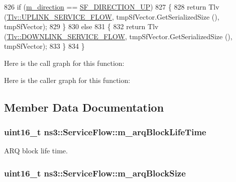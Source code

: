 \begin{DoxyCode}
826   \textcolor{keywordflow}{if} (\hyperlink{classns3_1_1ServiceFlow_aeadd654a7d1e5e6c64b6702fecc289dd}{m\_direction} == \hyperlink{classns3_1_1ServiceFlow_ae14b8dc8bb371bad10fe078110655d4fadbdc2e453d8d7a126f89ecedca018714}{SF\_DIRECTION\_UP})
827     \{
828       \textcolor{keywordflow}{return} Tlv (\hyperlink{classns3_1_1Tlv_ab275ea003645d46aada8e2b351de90e3a3b5488fc87cf6e32674c512bbf6bbb84}{Tlv::UPLINK\_SERVICE\_FLOW}, tmpSfVector.GetSerializedSize (), 
      tmpSfVector);
829     \}
830   \textcolor{keywordflow}{else}
831     \{
832       \textcolor{keywordflow}{return} Tlv (\hyperlink{classns3_1_1Tlv_ab275ea003645d46aada8e2b351de90e3a75b57001056f0b9395e079873cb38f1d}{Tlv::DOWNLINK\_SERVICE\_FLOW}, tmpSfVector.GetSerializedSize (), 
      tmpSfVector);
833     \}
834 \}
\end{DoxyCode}


Here is the call graph for this function\+:




Here is the caller graph for this function\+:




\subsection{Member Data Documentation}
\subsubsection[{\texorpdfstring{m\+\_\+arq\+Block\+Life\+Time}{m_arqBlockLifeTime}}]{\setlength{\rightskip}{0pt plus 5cm}uint16\+\_\+t ns3\+::\+Service\+Flow\+::m\+\_\+arq\+Block\+Life\+Time\hspace{0.3cm}{\ttfamily [private]}}\hypertarget{classns3_1_1ServiceFlow_a3f7676dbb3c6ef4e0ac07c6be47e0a45}{}\label{classns3_1_1ServiceFlow_a3f7676dbb3c6ef4e0ac07c6be47e0a45}


A\+RQ block life time. 

\subsubsection[{\texorpdfstring{m\+\_\+arq\+Block\+Size}{m_arqBlockSize}}]{\setlength{\rightskip}{0pt plus 5cm}uint16\+\_\+t ns3\+::\+Service\+Flow\+::m\+\_\+arq\+Block\+Size\hspace{0.3cm}{\ttfamily [private]}}\hypertarget{classns3_1_1ServiceFlow_a0ee048960c57c91cd2a41904682053bc}{}\label{classns3_1_1ServiceFlow_a0ee048960c57c91cd2a41904682053bc}


